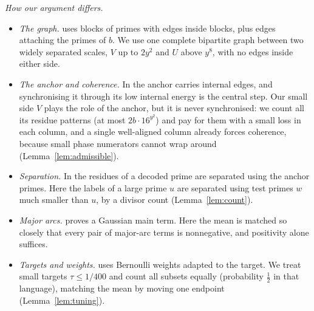 \documentclass[11pt]{amsart}
\theoremstyle{definition}
\theoremstyle{remark}
\begin{document}
\emph{How our argument differs.}
\begin{itemize}
\item \emph{The graph.} \cite{Tan26} uses blocks of primes with edges inside blocks, plus edges attaching the primes of $b$. We use one complete bipartite graph between two widely separated scales, $V$ up to $2y^2$ and $U$ above $y^8$, with no edges inside either side.
\item \emph{The anchor and coherence.} In \cite{Tan26} the anchor carries internal edges, and synchronising it through its low internal energy is the central step. Our small side $V$ plays the role of the anchor, but it is never synchronised: we count all its residue patterns (at most $2b\cdot16^{y^2}$) and pay for them with a small loss in each column, and a single well-aligned column already forces coherence, because small phase numerators cannot wrap around (Lemma~\ref{lem:admissible}).
\item \emph{Separation.} In \cite{Tan26} the residues of a decoded prime are separated using the anchor primes. Here the labels of a large prime $u$ are separated using test primes $w$ much smaller than $u$, by a divisor count (Lemma~\ref{lem:count}).
\item \emph{Major arcs.} \cite{Tan26} proves a Gaussian main term. Here the mean is matched so closely that every pair of major-arc terms is nonnegative, and positivity alone suffices.
\item \emph{Targets and weights.} \cite{Tan26} uses Bernoulli weights adapted to the target. We treat small targets $\tau\le1/400$ and count all subsets equally (probability $\frac12$ in that language), matching the mean by moving one endpoint (Lemma~\ref{lem:tuning}).
\end{itemize}
\end{document}

